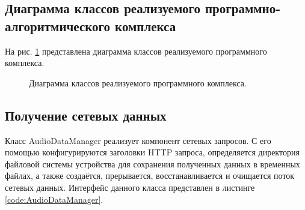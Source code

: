     \subsection{Диаграмма классов реализуемого программно-алгоритмического комплекса}
        \par На рис. \ref{fig:uml} представлена диаграмма классов реализуемого программного комплекса.
        \begin{figure}[!h]
            \caption{Диаграмма классов реализуемого программного комплекса.}
            \label{fig:uml}
        \end{figure}

    \subsection{Получение сетевых данных}
        \par Класс AudioDataManager реализует компонент сетевых запросов. 
        С его помощью конфигурируются заголовки HTTP запроса, 
        определяется директория файловой системы устройства для сохранения полученных данных в временных файлах, 
        а также создаётся, прерывается, восстанавливается и очищается поток сетевых данных.
        Интерфейс данного класса представлен в листинге \ref{code:AudioDataManager}.
        

